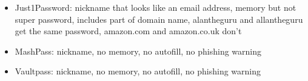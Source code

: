 \begin{itemize}

\item Just1Password: nickname that looks like an email address, memory but not super password, includes part of domain name, alantheguru and allantheguru get the same password, amazon.com and amazon.co.uk don't


\item MashPass: nickname, no memory, no autofill, no phishing warning


\item Vaultpass:  nickname, no memory, no autofill, no phishing warning

\end{itemize}



